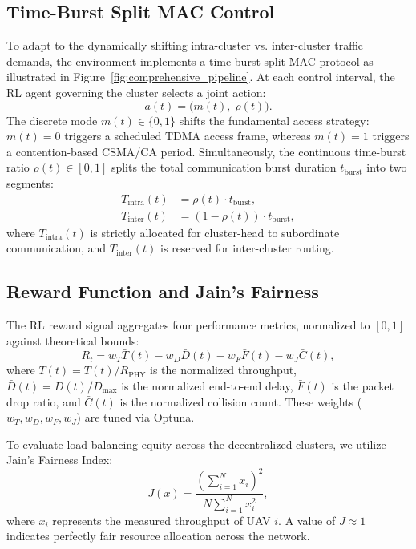 \subsection{Time-Burst Split MAC Control}

To adapt to the dynamically shifting intra-cluster vs. inter-cluster traffic demands, the environment implements a time-burst split MAC protocol as illustrated in Figure~\ref{fig:comprehensive_pipeline}. At each control interval, the RL agent governing the cluster selects a joint action:
\begin{equation}
    a(t) = \big(m(t),\; \rho(t)\big).
    \label{eq:action}
\end{equation}
The discrete mode $m(t) \in \{0, 1\}$ shifts the fundamental access strategy: $m(t)=0$ triggers a scheduled TDMA access frame, whereas $m(t)=1$ triggers a contention-based CSMA/CA period. 
Simultaneously, the continuous time-burst ratio $\rho(t) \in [0,1]$ splits the total communication burst duration $t_{\text{burst}}$ into two segments:
\begin{align}
    T_{\text{intra}}(t) &= \rho(t) \cdot t_{\text{burst}}, \label{eq:T1} \\
    T_{\text{inter}}(t) &= (1 - \rho(t)) \cdot t_{\text{burst}}, \label{eq:T2}
\end{align}
where $T_{\text{intra}}(t)$ is strictly allocated for cluster-head to subordinate communication, and $T_{\text{inter}}(t)$ is reserved for inter-cluster routing.



\subsection{Reward Function and Jain's Fairness}

The RL reward signal aggregates four performance metrics, normalized to $[0,1]$ against theoretical bounds:
\begin{equation}
    R_t = w_T \bar{T}(t) - w_D \bar{D}(t) - w_F \bar{F}(t) - w_J \bar{C}(t),
    \label{eq:reward}
\end{equation}
where $\bar{T}(t) = T(t) / R_{\text{PHY}}$ is the normalized throughput, $\bar{D}(t) = D(t) / D_{\max}$ is the normalized end-to-end delay, $\bar{F}(t)$ is the packet drop ratio, and $\bar{C}(t)$ is the normalized collision count. These weights ($w_T, w_D, w_F, w_J$) are tuned via Optuna.

To evaluate load-balancing equity across the decentralized clusters, we utilize Jain's Fairness Index:
\begin{equation}
    J(x) = \frac{\left( \sum_{i=1}^{N} x_i \right)^2}{N \sum_{i=1}^{N} x_i^2},
    \label{eq:jains}
\end{equation}
where $x_i$ represents the measured throughput of UAV $i$. A value of $J \approx 1$ indicates perfectly fair resource allocation across the network.


